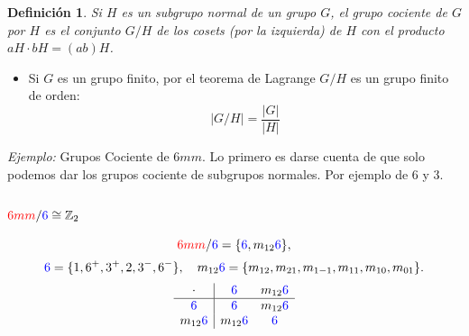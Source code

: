 \documentclass{report}
\newtheorem{definition}{Definición}
\begin{document}
\begin{definition}
 Si \( H \) es un subgrupo normal de un grupo \( G \), el \emph{grupo cociente} de \( G \) por \( H \) es el conjunto \( G/H \) de los cosets (por la izquierda) de \( H \) con el producto $aH \cdot bH = (ab)H$.
\end{definition}




\begin{itemize}
    \item Si \( G \) es un grupo finito, por el teorema de Lagrange \( G/H \) es un grupo finito de orden:
    \[
    |G/H| = \frac{|G|}{|H|}
    \]
\end{itemize}
\vspace{.5cm}

\textit{Ejemplo:} Grupos Cociente de \(6mm\). Lo primero es darse cuenta de que solo podemos dar los grupos cociente de subgrupos normales. Por ejemplo de 6 y 3.







\begin{multicols}{2}
\subsection*{\( \textcolor{red}{6mm} / \textcolor{blue}{6} \cong \mathbb{Z}_{2} \)}
\[
\textcolor{red}{6mm} / \textcolor{blue}{6} = \{ \textcolor{blue}{6}, m_{12}\textcolor{blue}{6} \},
\]
\[
\textcolor{blue}{6} = \{1, 6^+, 3^+, 2, 3^-, 6^-\}, \quad m_{12}\textcolor{blue}{6} = \{m_{12}, m_{21}, m_{1-1}, m_{11}, m_{10}, m_{01} \}.
\]
\columnbreak
\[
\begin{array}{c|cc}
\cdot & \textcolor{blue}{6} & m_{12}\textcolor{blue}{6}\\ \hline
\textcolor{blue}{6} & \textcolor{blue}{6} & m_{12}\textcolor{blue}{6}\\
m_{12}\textcolor{blue}{6} & m_{12}\textcolor{blue}{6} & \textcolor{blue}{6}
\end{array}
\]
\end{multicols}
\end{document}
